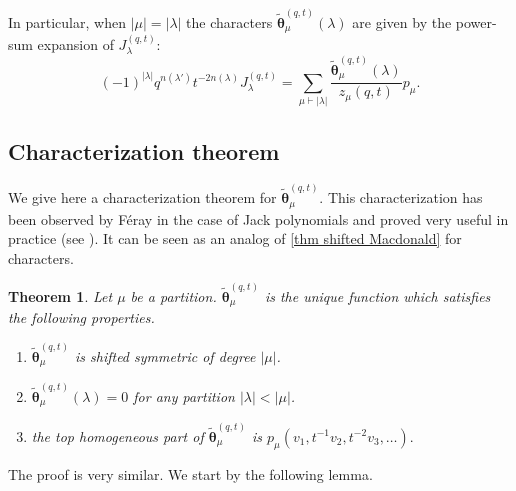 \documentclass[12pt]{amsart}
\newtheorem{thm}{Theorem}[section]
\theoremstyle{remark}
\newcommand{\Mch}{\boldsymbol{\widetilde\theta}^{(q,t)}}
\newcommand{\J}{{J}^{(q,t)}}
\begin{document}
\noindent In particular, when $|\mu|=|\lambda|$ the characters $\Mch_\mu(\lambda)$ are given by the power-sum expansion of $\J_\lambda$:
\begin{equation}\label{eq J characters}
(-1)^{|\lambda|}q^{n(\lambda')}t^{-2n(\lambda)}\J_\lambda=\sum_{\mu\vdash |\lambda|}\frac{\Mch_\mu(\lambda)}{z_\mu(q,t)} p_\mu.  \end{equation}

\subsection{Characterization theorem}
We give here a characterization theorem for $\Mch_\mu$. This characterization has been observed by Féray in the case of Jack polynomials and proved very useful in practice (see \cite{BenDaliDolega2023}). It can be seen as an analog of \cref{thm shifted Macdonald} for characters.

\begin{thm}\label{thm Feray}
Let $\mu$ be a partition. $\Mch_\mu$ is the unique function which satisfies the following properties.
\begin{enumerate}
    \item $\Mch_\mu$ is shifted symmetric of degree $|\mu|$. 
    \item $\Mch_\mu(\lambda)=0$ for any partition  $|\lambda|<|\mu|$.
    \item the top homogeneous part of $\Mch_\mu$ is $p_\mu(v_1,t^{-1}v_2,t^{-2}v_3,\dots).$
\end{enumerate}
\end{thm}

The proof is very similar.
We start by the following lemma.
\end{document}
